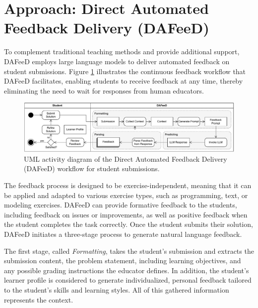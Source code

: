 \documentclass[manuscript,screen,review, anonymous]{acmart}
\begin{document}


\section{Approach: Direct Automated Feedback Delivery (DAFeeD)} %
\label{sec:approach:DAFeeD}

To complement traditional teaching methods and provide additional support, DAFeeD employs large language models to deliver automated feedback on student submissions.
Figure \ref{fig:DAFeeD-workflow} illustrates the continuous feedback workflow that DAFeeD facilitates, enabling students to receive feedback at any time, thereby eliminating the need to wait for responses from human educators.

\begin{figure}[htbp]
  \centering
  \includegraphics[width=\linewidth]{figures/DAFeeD-ActivityDiagram_alternative.pdf}
  \caption{UML activity diagram of the Direct Automated Feedback Delivery (DAFeeD) workflow for student submissions.}
  \label{fig:DAFeeD-workflow}
\end{figure}

The feedback process is designed to be exercise-independent, meaning that it can be applied and adapted to various exercise types, such as programming, text, or modeling exercises.
DAFeeD can provide formative feedback to the students, including feedback on issues or improvements, as well as positive feedback when the student completes the task correctly.
Once the student submits their solution, DAFeeD initiates a three-stage process to generate natural language feedback.

The first stage, called \textit{Formatting}, takes the student's submission and extracts the submission content, the problem statement, including learning objectives, and any possible grading instructions the educator defines.
In addition, the student's learner profile \cite{alexander:1998:ProfilingDifferencesStudents} is considered to generate individualized, personal feedback tailored to the student's skills and learning styles.
All of this gathered information represents the context.
\end{document}
